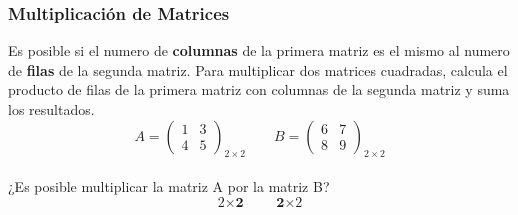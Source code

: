 \documentclass[stu, 12pt, letterpaper, donotrepeattitle, floatsintext, natbib]{apa7}
\begin{document}
    \subsubsection{Multiplicación de Matrices}
    Es posible si el numero de \textbf{columnas} de la primera matriz es el mismo al numero de \textbf{filas} de la segunda matriz.
    Para multiplicar dos matrices cuadradas, calcula el producto de filas de la primera matriz con columnas de la segunda matriz y suma los resultados.
    \[
        A=\begin{pmatrix}
              1 & 3 \\ 4 & 5
        \end{pmatrix}_{2\times2}
        \qquad
        B=\begin{pmatrix}
              6 & 7 \\ 8 & 9
        \end{pmatrix}_{2\times2}
    \]\\

    ¿Es posible multiplicar la matriz A por la matriz B?
    \[{\textit{2}\times\textbf{2}} \qquad {\textbf{2}\times\textit{2}}\]\\
\end{document}
